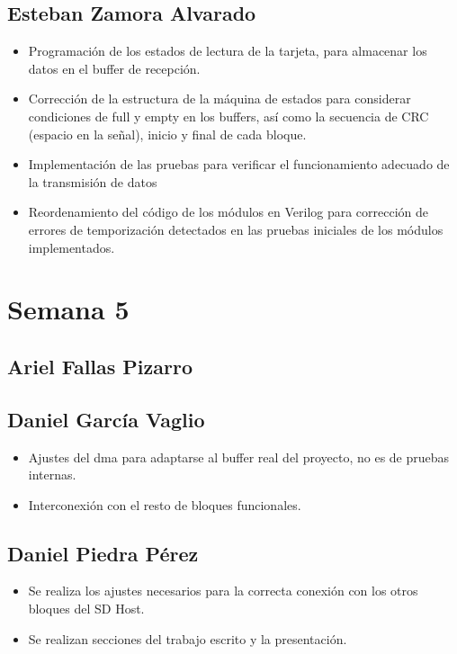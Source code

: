 \subsection{Esteban Zamora Alvarado}
\begin{itemize}
\item Programación de los estados de lectura de la tarjeta, para almacenar los datos en el buffer de recepción. 
\item Corrección de la estructura de la máquina de estados para considerar condiciones de full y
  empty en los buffers, así como la secuencia de CRC (espacio en la señal), inicio y final de cada bloque.
\item Implementación de las pruebas para verificar el funcionamiento adecuado de la transmisión de datos
\item Reordenamiento del código de los módulos en Verilog para corrección de errores de
  temporización detectados en las pruebas iniciales de los módulos implementados.
\end{itemize}
\newpage

\section{Semana 5}
\subsection{Ariel Fallas Pizarro}


\subsection{Daniel García Vaglio}
\begin{itemize}
\item Ajustes del dma para adaptarse al buffer real del proyecto, no es de pruebas internas.
\item Interconexión con el resto de bloques funcionales. 
\end{itemize}
\subsection{Daniel Piedra Pérez}
\begin{itemize}
\item Se realiza los ajustes necesarios para la correcta conexión con los otros bloques del SD Host.
\item Se realizan secciones del trabajo escrito y la presentación.
\end{itemize}

